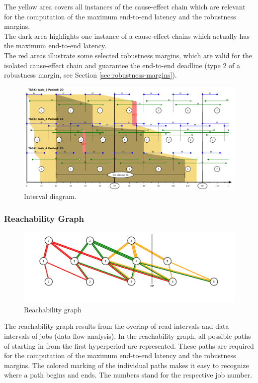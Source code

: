The yellow area covers all instances of the cause-effect chain which are relevant for the computation of the maximum end-to-end latency and the robustness margins. \\
The dark area highlights one instance of a cause-effect chains which actually has the maximum end-to-end latency. \\
The red areas illustrate some selected robustness margins, which are valid for the isolated cause-effect chain and guarantee the end-to-end deadline (type 2 of a robustness margin, see Section \ref{sec:robustness-margins}).
%
\begin{figure}[h!]
		\centering
		\includegraphics[width=415pt]{fig/intervalls.pdf}
		\caption{Interval diagram.}
		\label{fig:interval_diagram}
\end{figure}


\newpage
\subsubsection{Reachability Graph}
%
\begin{figure}[H]
		\centering
		\includegraphics[width=400pt]{fig/tree.pdf}
		\caption{Reachability graph}
		\label{fig:reachability}
\end{figure}
%
The reachability graph results from the overlap of read intervals and data intervals of jobs (data flow analysis). 
In the reachability graph, all possible paths of starting in from the first hyperperiod are represented.
These paths are required for the computation of the maximum end-to-end latency and the robustness margins. 
The colored marking of the individual paths makes it easy to recognize where a path begins and ends. The numbers stand for the respective job number. 
    

